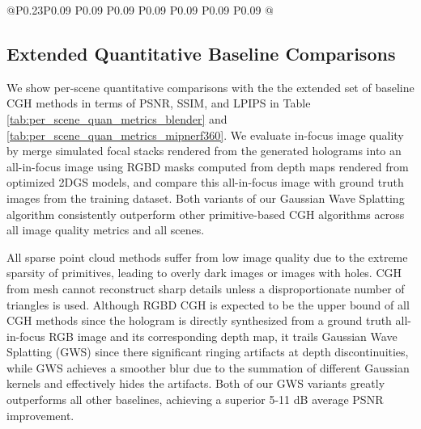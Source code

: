 \begin{table}[!ht]
\begin{tabular}{@{}P{0.23\textwidth}P{0.09 \textwidth}P{0.09 \textwidth}P{0.09 \textwidth}P{0.09 \textwidth}P{0.09 \textwidth}P{0.09 \textwidth}P{0.09 \textwidth}@{}}
   \bottomrule
   \end{tabular}
\caption{\textbf{Quantitative performance of different CGH algorithms on the Mip-NeRF 360 \cite{barron2022mipnerf360} dataset. }  We evaluate the image quality of 3D holograms generated using our Gaussian Wave Splatting algorithm and various baseline primitives-based CGH methods in terms of PSNR $(\uparrow)$, SSIM $(\uparrow)$, and LPIPS $(\downarrow)$. All point cloud methods suffer from poor image quality due to the overly dim images with black holes. CGH from mesh outperforms point cloud methods, but high frequency details still cannot be reconstructed with per-face colors. CGH from RGBD images achieves much better quality, but still trails Gaussian Wave Splatting due to the unnatural ringing artifacts at depth discontinuities. Both exact and fast variants of Gaussian Wave Splatting achieve superior results over all baseline methods. }
\label{tab:per_scene_quan_metrics_mipnerf360}
\end{table}

\subsection{Extended Quantitative Baseline Comparisons}

We show per-scene quantitative comparisons with the the extended set of baseline CGH methods in terms of PSNR, SSIM, and LPIPS in Table \ref{tab:per_scene_quan_metrics_blender} and \ref{tab:per_scene_quan_metrics_mipnerf360}. We evaluate in-focus image quality by merge simulated focal stacks rendered from the generated holograms into an all-in-focus image using RGBD masks computed from depth maps rendered from optimized 2DGS models, and compare this all-in-focus image with ground truth images from the training dataset. Both variants of our Gaussian Wave Splatting algorithm consistently outperform other primitive-based CGH algorithms across all image quality metrics and all scenes. 

All sparse point cloud methods suffer from low image quality due to the extreme sparsity of primitives, leading to overly dark images or images with holes. CGH from mesh cannot reconstruct sharp details unless a disproportionate number of triangles is used. Although RGBD CGH is expected to be the upper bound of all CGH methods since the hologram is directly synthesized from a ground truth all-in-focus RGB image and its corresponding depth map, it trails Gaussian Wave Splatting (GWS) since there significant ringing artifacts at depth discontinuities, while GWS achieves a smoother blur due to the summation of different Gaussian kernels and effectively hides the artifacts. Both of our GWS variants greatly outperforms all other baselines, achieving a superior 5-11 dB average PSNR improvement. 

